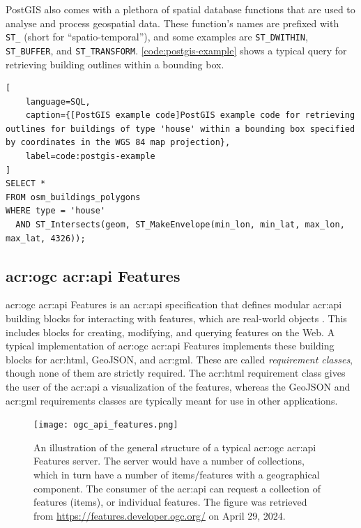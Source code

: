 PostGIS also comes with a plethora of spatial database functions that are used to analyse and process geospatial data. These function's names are prefixed with \texttt{ST\_} (short for \enquote{spatio-temporal}), and some examples are \texttt{ST\_DWITHIN}, \texttt{ST\_BUFFER}, and \texttt{ST\_TRANSFORM}. \autoref{code:postgis-example} shows a typical query for retrieving building outlines within a bounding box.

\begin{lstlisting}[
    language=SQL,
    caption={[PostGIS example code]PostGIS example code for retrieving outlines for buildings of type 'house' within a bounding box specified by coordinates in the WGS 84 map projection},
    label=code:postgis-example
]
SELECT * 
FROM osm_buildings_polygons 
WHERE type = 'house' 
  AND ST_Intersects(geom, ST_MakeEnvelope(min_lon, min_lat, max_lon, max_lat, 4326));
\end{lstlisting}

\subsection[OGC API Features]{\acrshort{acr:ogc} \acrshort{acr:api} Features}
\label{subsec:ogc-api-features}

\acrshort{acr:ogc} \acrshort{acr:api} Features is an \acrshort{acr:api} specification that defines modular \acrshort{acr:api} building blocks for interacting with features, which are real-world objects \citep{opengeospatialconsortiumOGCAPIFeatures2022}. This includes blocks for creating, modifying, and querying features on the Web. A typical implementation of \acrshort{acr:ogc} \acrshort{acr:api} Features implements these building blocks for \acrshort{acr:html}, GeoJSON, and \acrshort{acr:gml}. These are called \textit{requirement classes}, though none of them are strictly required. The \acrshort{acr:html} requirement class gives the user of the \acrshort{acr:api} a visualization of the features, whereas the GeoJSON and \acrshort{acr:gml} requirements classes are typically meant for use in other applications.

\begin{figure}[h]
    \centering
    \texttt{[image: ogc\_api\_features.png]}
    \caption[An illustration of the general structure of a typical OGC API Features server]{An illustration of the general structure of a typical \acrshort{acr:ogc} \acrshort{acr:api} Features server. The server would have a number of collections, which in turn have a number of items/features with a geographical component. The consumer of the \acrshort{acr:api} can request a collection of features (items), or individual features. The figure was retrieved from \url{https://features.developer.ogc.org/} on April 29, 2024.}
    \label{fig:oaf-collections-items-features}
\end{figure}

